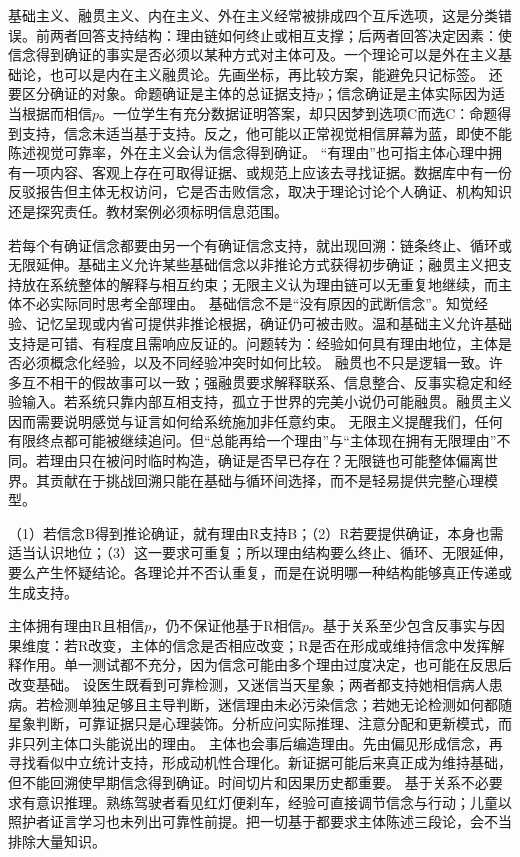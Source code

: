  基础主义、融贯主义、内在主义、外在主义经常被排成四个互斥选项，这是分类错误。前两者回答支持结构：理由链如何终止或相互支撑；后两者回答决定因素：使信念得到确证的事实是否必须以某种方式对主体可及。一个理论可以是外在主义基础论，也可以是内在主义融贯论。先画坐标，再比较方案，能避免只记标签。 还要区分确证的对象。命题确证是主体的总证据支持$p$；信念确证是主体实际因为适当根据而相信$p$。一位学生有充分数据证明答案，却只因梦到选项C而选C：命题得到支持，信念未适当基于支持。反之，他可能以正常视觉相信屏幕为蓝，即使不能陈述视觉可靠率，外在主义会认为信念得到确证。 “有理由”也可指主体心理中拥有一项内容、客观上存在可取得证据、或规范上应该去寻找证据。数据库中有一份反驳报告但主体无权访问，它是否击败信念，取决于理论讨论个人确证、机构知识还是探究责任。教材案例必须标明信息范围。

若每个有确证信念都要由另一个有确证信念支持，就出现回溯：链条终止、循环或无限延伸。基础主义允许某些基础信念以非推论方式获得初步确证；融贯主义把支持放在系统整体的解释与相互约束；无限主义认为理由链可以无重复地继续，而主体不必实际同时思考全部理由。 基础信念不是“没有原因的武断信念”。知觉经验、记忆呈现或内省可提供非推论根据，确证仍可被击败。温和基础主义允许基础支持是可错、有程度且需响应反证的。问题转为：经验如何具有理由地位，主体是否必须概念化经验，以及不同经验冲突时如何比较。 融贯也不只是逻辑一致。许多互不相干的假故事可以一致；强融贯要求解释联系、信息整合、反事实稳定和经验输入。若系统只靠内部互相支持，孤立于世界的完美小说仍可能融贯。融贯主义因而需要说明感觉与证言如何给系统施加非任意约束。 无限主义提醒我们，任何有限终点都可能被继续追问。但“总能再给一个理由”与“主体现在拥有无限理由”不同。若理由只在被问时临时构造，确证是否早已存在？无限链也可能整体偏离世界。其贡献在于挑战回溯只能在基础与循环间选择，而不是轻易提供完整心理模型。

\begin{argumentbox}[回溯论证]
（1）若信念B得到推论确证，就有理由R支持B；（2）R若要提供确证，本身也需适当认识地位；（3）这一要求可重复；所以理由结构要么终止、循环、无限延伸，要么产生怀疑结论。各理论并不否认重复，而是在说明哪一种结构能够真正传递或生成支持。
\end{argumentbox}

主体拥有理由R且相信$p$，仍不保证他基于R相信$p$。基于关系至少包含反事实与因果维度：若R改变，主体的信念是否相应改变；R是否在形成或维持信念中发挥解释作用。单一测试都不充分，因为信念可能由多个理由过度决定，也可能在反思后改变基础。 设医生既看到可靠检测，又迷信当天星象；两者都支持她相信病人患病。若检测单独足够且主导判断，迷信理由未必污染信念；若她无论检测如何都随星象判断，可靠证据只是心理装饰。分析应问实际推理、注意分配和更新模式，而非只列主体口头能说出的理由。 主体也会事后编造理由。先由偏见形成信念，再寻找看似中立统计支持，形成动机性合理化。新证据可能后来真正成为维持基础，但不能回溯使早期信念得到确证。时间切片和因果历史都重要。 基于关系不必要求有意识推理。熟练驾驶者看见红灯便刹车，经验可直接调节信念与行动；儿童以照护者证言学习也未列出可靠性前提。把一切基于都要求主体陈述三段论，会不当排除大量知识。

